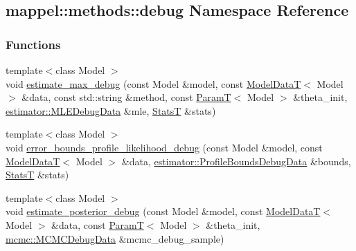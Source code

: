 \hypertarget{namespacemappel_1_1methods_1_1debug}{}\subsection{mappel\+:\+:methods\+:\+:debug Namespace Reference}
\label{namespacemappel_1_1methods_1_1debug}
\subsubsection*{Functions}
\begin{DoxyCompactItemize}
\item 
{\footnotesize template$<$class Model $>$ }\\void \hyperlink{namespacemappel_1_1methods_1_1debug_a38de1b4f98bfb724874fec99b53a8554}{estimate\+\_\+max\+\_\+debug} (const Model \&model, const \hyperlink{namespacemappel_a97f050df953605381ae9c901c3b125f1}{Model\+DataT}$<$ Model $>$ \&data, const std\+::string \&method, const \hyperlink{namespacemappel_a667925cb0d6c0e49f2f035cc5a9a6857}{ParamT}$<$ Model $>$ \&theta\+\_\+init, \hyperlink{structmappel_1_1estimator_1_1MLEDebugData}{estimator\+::\+M\+L\+E\+Debug\+Data} \&mle, \hyperlink{namespacemappel_a04ab395b0cf82c4ce68a36b2212649a5}{StatsT} \&stats)
\item 
{\footnotesize template$<$class Model $>$ }\\void \hyperlink{namespacemappel_1_1methods_1_1debug_a3fc6147e9b38e7b8328eb421be81a200}{error\+\_\+bounds\+\_\+profile\+\_\+likelihood\+\_\+debug} (const Model \&model, const \hyperlink{namespacemappel_a97f050df953605381ae9c901c3b125f1}{Model\+DataT}$<$ Model $>$ \&data, \hyperlink{namespacemappel_1_1estimator_structmappel_1_1estimator_1_1ProfileBoundsDebugData}{estimator\+::\+Profile\+Bounds\+Debug\+Data} \&bounds, \hyperlink{namespacemappel_a04ab395b0cf82c4ce68a36b2212649a5}{StatsT} \&stats)
\item 
{\footnotesize template$<$class Model $>$ }\\void \hyperlink{namespacemappel_1_1methods_1_1debug_a5d84632af17af6d244b5a82b9d55f2ba}{estimate\+\_\+posterior\+\_\+debug} (const Model \&model, const \hyperlink{namespacemappel_a97f050df953605381ae9c901c3b125f1}{Model\+DataT}$<$ Model $>$ \&data, const \hyperlink{namespacemappel_a667925cb0d6c0e49f2f035cc5a9a6857}{ParamT}$<$ Model $>$ \&theta\+\_\+init, \hyperlink{structmappel_1_1mcmc_1_1MCMCDebugData}{mcmc\+::\+M\+C\+M\+C\+Debug\+Data} \&mcmc\+\_\+debug\+\_\+sample)
\end{DoxyCompactItemize}


